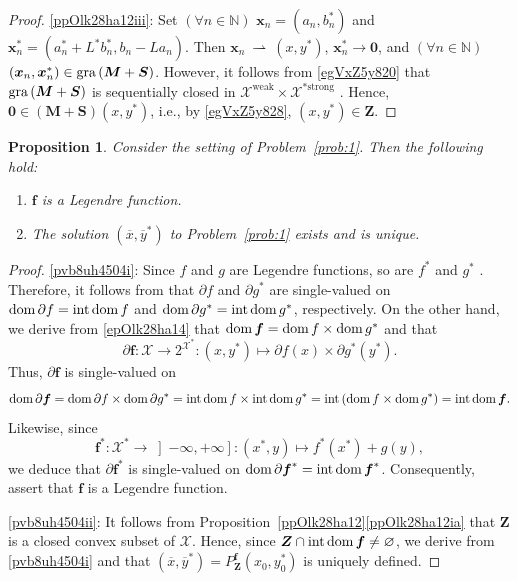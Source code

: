 \documentclass[a4paper,11pt,fleqn]{article}
\newcommand{\RX}{\ensuremath{\left]-\infty,+\infty\right]}}
\newcommand{\XX}{\ensuremath{{\mathcal X}}}
\newcommand{\XXX}{\ensuremath{\boldsymbol{\mathcal X}}}
\newcommand{\emp}{\ensuremath{{\varnothing}}}
\newcommand{\NN}{\ensuremath{\mathbb N}}
\newcommand{\weakly}{\ensuremath{\:\rightharpoonup\:}}
\newcommand{\dom}{\ensuremath{\text{\rm dom}\,}}
\newcommand{\inte}{\ensuremath{\text{\rm int}\,}}
\newcommand{\intdom}{\ensuremath{\text{\rm int\,dom}\,}}
\newcommand{\gra}{\ensuremath{\text{\rm gra}\,}}
\newtheorem{proposition}[theorem]{Proposition}
\theoremstyle{plain}{\theorembodyfont{\rmfamily}%
\newtheorem{conjecture}[theorem]{Conjecture}}
\theoremstyle{plain}{\theorembodyfont{\rmfamily}%
\newtheorem{example}[theorem]{Example}}
\theoremstyle{plain}{\theorembodyfont{\rmfamily}%
\newtheorem{remark}[theorem]{Remark}}
\theoremstyle{plain}{\theorembodyfont{\rmfamily}%
\newtheorem{algorithm}[theorem]{Algorithm}}
\theoremstyle{plain}{\theorembodyfont{\rmfamily}%
\newtheorem{condition}[theorem]{Condition}}
\theoremstyle{plain}{\theorembodyfont{\rmfamily}%
\newtheorem{definition}[theorem]{Definition}}
\theoremstyle{plain}{\theorembodyfont{\rmfamily}
\newtheorem{problem}[theorem]{Problem}}
\theoremstyle{plain}{\theorembodyfont{\rmfamily}
\newtheorem{notation}[theorem]{Notation}}
\numberwithin{equation}{section}
\begin{document}
\begin{proof}
\ref{ppOlk28ha12iii}: 
Set $(\forall n\in\NN)$ $\boldsymbol{x}_n=(a_n,b_n^*)$ and 
$\boldsymbol{x}_n^*=(a_n^*+L^*b_n^*,b_n-La_n)$. Then 
$\boldsymbol{x}_n\weakly (x,y^*)$, 
$\boldsymbol{x}_n^*\to \boldsymbol{0}$, and $(\forall n\in\NN)$ 
$(\boldsymbol{x}_n,\boldsymbol{x}_n^*)\in
\gra(\boldsymbol{M}+\boldsymbol{S})$. 
However, it follows from \eqref{egVxZ5y820} that 
$\gra(\boldsymbol{M}+\boldsymbol{S})$ is sequentially closed 
in $\XXX^{\text{weak}}\times\XXX^{*\text{strong}}$ 
\cite[Lemma~1.2]{IVBro65}. Hence, 
$\boldsymbol{0}\in(\boldsymbol{M}+\boldsymbol{S})(x,y^*)$, 
i.e., by \eqref{egVxZ5y828}, $(x,y^*)\in\boldsymbol{Z}$.
\end{proof}

\begin{proposition}
\label{pvb8uh4504}
Consider the setting of Problem~\ref{prob:1}. Then the 
following hold:
\begin{enumerate}
\item
\label{pvb8uh4504i}
$\boldsymbol{f}$ is a Legendre function.
\item
\label{pvb8uh4504ii}
The solution $(\overline{x},\overline{y}^*)$ to
Problem~\ref{prob:1} exists and is unique.
\end{enumerate}
\end{proposition}
\begin{proof}
\ref{pvb8uh4504i}:
Since $f$ and $g$ are Legendre functions, so are $f^*$ and $g^*$  
\cite[Corollary~5.5]{Ccm01}. Therefore, it follows from 
\cite[Theorem~5.6(iii)]{Ccm01} that $\partial f$ and 
$\partial g^*$ are single-valued on $\dom\partial f=\intdom f$ 
and $\dom\partial g^*=\intdom g^*$, respectively. 
On the other hand, we derive from \eqref{epOlk28ha14} that 
$\dom\boldsymbol{f}=\dom f\times\dom g^*$ and that
\begin{equation}
\partial\boldsymbol{f}\colon\boldsymbol{\XX}\to 
2^{\boldsymbol{\XX^*}}\colon (x,y^*)\mapsto 
\partial f(x)\times\partial g^*(y^*).
\end{equation}
Thus, $\partial\boldsymbol{f}$ is single-valued on 
\begin{equation}
\label{ebcn5y731}
\dom\partial\boldsymbol{f}=\dom\partial f\times\dom\partial g^*
=\intdom f\times\intdom g^*=\inte(\dom f\times\dom g^*)
=\intdom\boldsymbol{f}.
\end{equation}
Likewise, since 
\begin{equation}
\boldsymbol{f}^*\colon\XX^*\to\RX\colon 
(x^*,y)\mapsto f^*(x^*)+g(y), 
\end{equation}
we deduce that $\partial\boldsymbol{f}^*$ is single-valued on 
$\dom\partial\boldsymbol{f}^*=\intdom\boldsymbol{f}^*$. 
Consequently, \cite[Theorems~5.4 and~5.6]{Ccm01} assert that 
$\boldsymbol{f}$ is a Legendre function.

\ref{pvb8uh4504ii}: It follows from 
Proposition~\ref{ppOlk28ha12}\ref{ppOlk28ha12ia} that 
$\boldsymbol{Z}$ is a closed convex subset of $\XXX$.
Hence, since
$\boldsymbol{Z}\cap\text{\rm int\,dom}\,\boldsymbol{f}\neq\emp$,
we derive from \ref{pvb8uh4504i} and 
\cite[Corollary~7.9]{Ccm01} that
$(\overline{x},\overline{y}^*)=P^{\boldsymbol{f}}_{\boldsymbol{Z}}
(x_0,y_0^*)$ is uniquely defined.
\end{proof}
\end{document}
